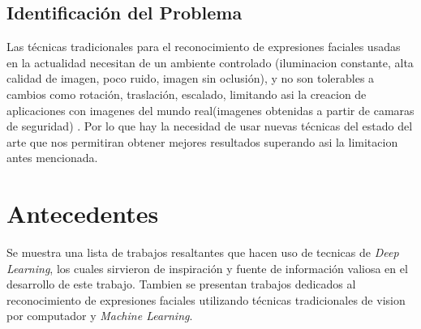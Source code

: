 \subsection{Identificación del Problema}
Las técnicas tradicionales para el reconocimiento de expresiones faciales usadas en la actualidad necesitan de un ambiente controlado (iluminacion constante, alta calidad de imagen, poco ruido, imagen sin oclusión), y no son tolerables a cambios como rotación, traslación, escalado, limitando asi la creacion de aplicaciones con imagenes del mundo real(imagenes obtenidas a partir de camaras de seguridad) . Por lo que hay la necesidad de usar nuevas técnicas del estado del arte que nos permitiran obtener mejores resultados superando asi la limitacion antes mencionada.

\section{Antecedentes}
Se muestra una lista de trabajos resaltantes que hacen uso de tecnicas de \textit{Deep Learning}, los cuales sirvieron de inspiración y fuente de información valiosa en el desarrollo de este trabajo. Tambien se presentan trabajos dedicados al reconocimiento de expresiones faciales utilizando técnicas tradicionales de vision por computador y \textit{Machine Learning}.


